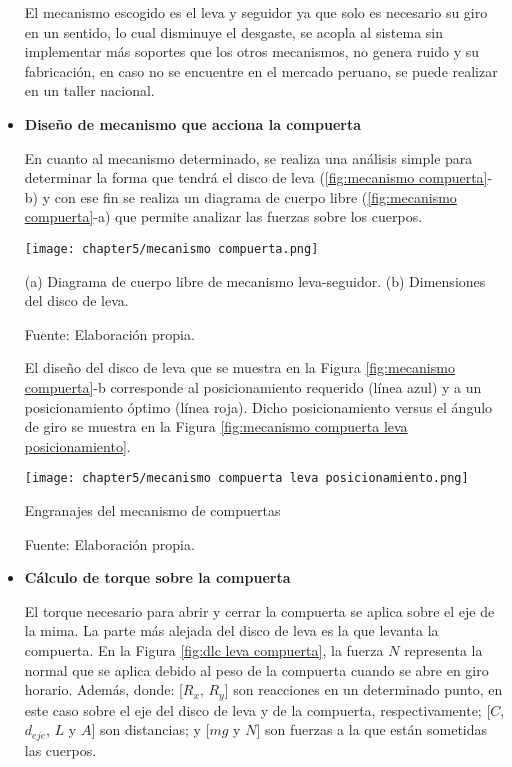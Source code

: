 \begin{itemize}
	El mecanismo escogido es el leva y seguidor ya que solo es necesario su giro en un sentido, lo cual disminuye el desgaste, se acopla al sistema sin implementar más soportes que los otros mecanismos, no genera ruido y su fabricación, en caso no se encuentre en el mercado peruano, se puede realizar en un taller nacional.  	
	
	\item \textbf{Diseño de mecanismo que acciona la compuerta}
	
	En cuanto al mecanismo determinado, se realiza una análisis simple para determinar la forma que tendrá el disco de leva (\ref{fig:mecanismo compuerta}-b) y con ese fin se realiza un diagrama de cuerpo libre (\ref{fig:mecanismo compuerta}-a) que permite analizar las fuerzas sobre los cuerpos.
	
	\begin{myfigure}[H]
		\footnotesize\centering
		\texttt{[image: chapter5/mecanismo compuerta.png]}
		\caption[Mecanismo leva-seguidor]{(a) Diagrama de cuerpo libre de mecanismo leva-seguidor. (b) Dimensiones del disco de leva.}
		\begin{myflushcenter}
			Fuente: Elaboración propia.
		\end{myflushcenter}
		\label{fig:mecanismo compuerta}
	\end{myfigure}
	
	El diseño del disco de leva que se muestra en la Figura \ref{fig:mecanismo compuerta}-b corresponde al posicionamiento requerido (línea azul) y a un posicionamiento óptimo (línea roja). Dicho posicionamiento versus el ángulo de giro se muestra en la Figura \ref{fig:mecanismo compuerta leva posicionamiento}. 
	
	\begin{myfigure}[H]
		\footnotesize\centering
		\texttt{[image: chapter5/mecanismo compuerta leva posicionamiento.png]}
		\caption{Engranajes del mecanismo de compuertas}
		\begin{myflushcenter}
			Fuente: Elaboración propia.
		\end{myflushcenter}
		\label{fig:mecanismo compuerta leva posicionamiento}
	\end{myfigure}
	
	\item \textbf{Cálculo de torque sobre la compuerta}
		
	El torque necesario para abrir y cerrar la compuerta se aplica sobre el eje de la mima. La parte más alejada del disco de leva es la que levanta la compuerta. En la Figura \ref{fig:dlc leva compuerta}, la fuerza $N$ representa la normal que se aplica debido al peso de la compuerta cuando se abre en giro horario. Además, donde: [$R_x$, $R_y$] son reacciones en un determinado punto, en este caso sobre el eje del disco de leva y de la compuerta, respectivamente; [$C$, $d_{eje}$, $L$ y $A$] son distancias; y [$mg$ y $N$] son fuerzas a la que están sometidas las cuerpos.
	

\end{itemize}
